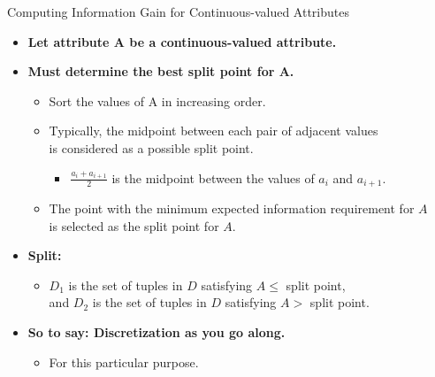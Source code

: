 \begin{frame}{Computing Information Gain for Continuous-valued Attributes}
	\begin{itemize}
		\item \textbf{Let attribute A be a continuous-valued attribute.}
		\item \textbf{Must determine the best split point for A.}
		      \begin{itemize}
			      \item Sort the values of A in increasing order.
			      \item Typically, the midpoint between each pair of adjacent values \\ is considered as a possible split point.
			            \begin{itemize}
				            \item $\frac{a_i+a_{i+1}}{2}$ is the midpoint between the values of $a_i$ and $a_{i+1}$.
			            \end{itemize}
			      \item The point with the minimum expected information requirement for $A$ \\ is selected as the split point for $A$.
		      \end{itemize}
		\item \textbf{Split:}
		      \begin{itemize}
			      \item $D_1$ is the set of tuples in $D$ satisfying $A \leq$ split point,\\
			            and $D_2$ is the set of tuples in $D$ satisfying $A >$ split point.
		      \end{itemize}
		\item \textbf{So to say: Discretization as you go along.}
		      \begin{itemize}
			      \item For this particular purpose.
		      \end{itemize}
	\end{itemize}
\end{frame}

